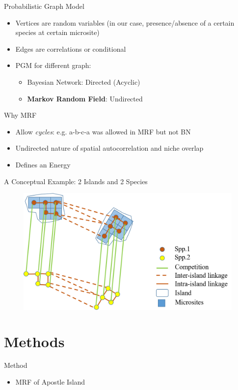 \documentclass{beamer}
\begin{document}
\begin{frame}{Probabilistic Graph Model}
	\begin{itemize}
		\item Vertices are random variables (in our case, presence/absence of a certain species at certain microsite)
		\item Edges are correlations or conditional
		\item PGM for different graph:
		\begin{itemize}
			\item Bayesian Network: Directed (Acyclic)
			\item \textbf{Markov Random Field}: Undirected
		\end{itemize}
	\end{itemize}
\end{frame}

\begin{frame}{Why MRF}
	\begin{itemize}
		\item Allow \textit{cycles}: e.g. a-b-c-a was allowed in MRF but not BN
		\item Undirected nature of spatial autocorrelation and niche overlap
		\item Defines an Energy
	\end{itemize}
\end{frame}

\begin{frame}{A Conceptual Example: 2 Islands and 2 Species}
	\begin{figure}[ht]
		\centering
		\includegraphics[scale=.4]{fig/APIS/sample_graph.png}
		\label{sample_graph}
	\end{figure}
\end{frame}

\section{Methods}
\begin{frame}{Method}
	\begin{itemize}
		\item MRF of Apostle Island
	\end{itemize}
\end{frame}
\end{document}
